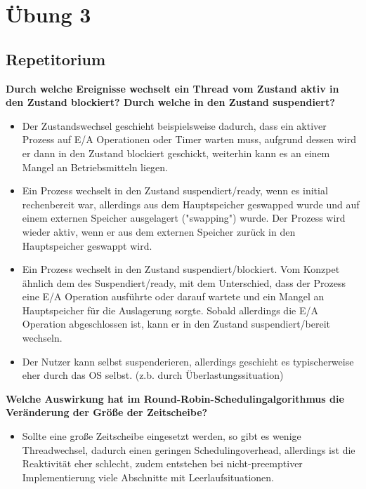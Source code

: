 \documentclass[a4paper]{article}
\begin{document}
\newpage
\section{Übung 3}
\subsection{Repetitorium}
\begin{itemize*}
    \item \textbf{Durch welche Ereignisse wechselt ein Thread vom Zustand aktiv in den Zustand blockiert? Durch welche in den Zustand suspendiert?}
    \begin{itemize}
        \item Der Zustandswechsel geschieht beispielsweise dadurch, dass ein aktiver Prozess auf E/A Operationen oder Timer warten muss, aufgrund dessen wird er dann in den Zustand blockiert geschickt, weiterhin kann es an einem Mangel an Betriebsmitteln liegen.
        \item Ein Prozess wechselt in den Zustand suspendiert/ready, wenn es initial rechenbereit war, allerdings aus dem Hauptspeicher geswapped wurde und auf einem externen Speicher ausgelagert ("swapping") wurde. Der Prozess wird wieder aktiv, wenn er aus dem externen Speicher zurück in den Hauptspeicher geswappt wird.
        \item Ein Prozess wechselt in den Zustand suspendiert/blockiert. Vom Konzpet ähnlich dem des Suspendiert/ready, mit dem Unterschied, dass der Prozess eine E/A Operation ausführte oder darauf wartete und ein Mangel an Hauptspeicher für die Auslagerung sorgte. Sobald allerdings die E/A Operation abgeschlossen ist, kann er in den Zustand suspendiert/bereit wechseln.
        \item Der Nutzer kann selbst suspenderieren, allerdings geschieht es typischerweise eher durch das OS selbst. (z.b. durch Überlastungssituation)
    \end{itemize}
    \item \textbf{Welche Auswirkung hat im Round-Robin-Schedulingalgorithmus die Veränderung der Größe der Zeitscheibe?}
    \begin{itemize}
        \item Sollte eine große Zeitscheibe eingesetzt werden, so gibt es wenige Threadwechsel, dadurch einen geringen Schedulingoverhead, allerdings ist die Reaktivität eher schlecht, zudem entstehen bei nicht-preemptiver Implementierung viele Abschnitte mit Leerlaufsituationen.

\end{itemize}
\end{itemize*}
\end{document}

